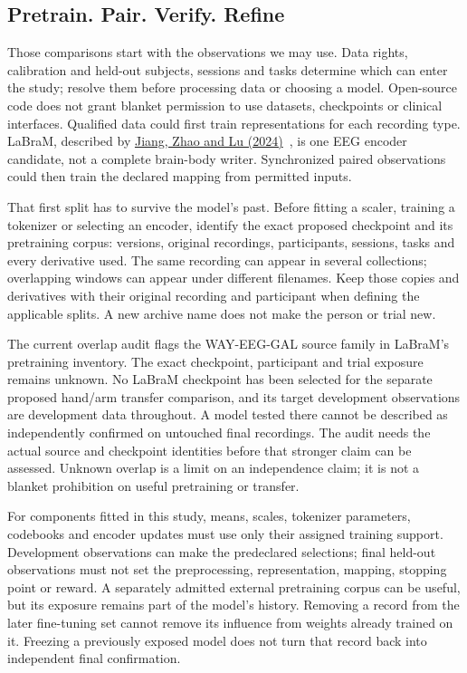 \subsection{Pretrain. Pair. Verify. Refine}
Those comparisons start with the observations we may use. Data rights,
calibration and held-out subjects, sessions and tasks determine which can
enter the study; resolve them before processing data or choosing a model.
Open-source code does not grant blanket permission to use datasets,
checkpoints or clinical interfaces. Qualified data could first train
representations for each recording type. LaBraM, described by \href{https://arxiv.org/html/2405.18765v1}{Jiang, Zhao and Lu (2024)}~\cite{labram2024}, is one EEG encoder
candidate, not a complete brain-body writer. Synchronized paired observations could
then train the declared mapping from permitted inputs.

That first split has to survive the model's past. Before fitting a scaler,
training a tokenizer or selecting an encoder, identify the exact proposed
checkpoint and its pretraining corpus: versions, original recordings,
participants, sessions, tasks and every derivative used. The same recording
can appear in several collections; overlapping windows can appear under
different filenames. Keep those copies and derivatives with their original
recording and participant when defining the applicable splits. A new archive
name does not make the person or trial new.

The current overlap audit flags the WAY-EEG-GAL source family in LaBraM's
pretraining inventory. The exact checkpoint, participant and trial exposure
remains unknown. No LaBraM checkpoint has been selected for the separate
proposed hand/arm transfer comparison, and its target development observations
are development data throughout. A model tested there cannot be described as
independently confirmed on untouched final recordings. The audit needs the
actual source and checkpoint identities before that stronger claim can be
assessed. Unknown overlap is a limit on an independence claim; it is not a
blanket prohibition on useful pretraining or transfer.

For components fitted in this study, means, scales, tokenizer parameters,
codebooks and encoder updates must use only their assigned training support.
Development observations can make the predeclared selections; final held-out
observations must not set the preprocessing, representation, mapping, stopping
point or reward. A separately admitted external pretraining corpus can be
useful, but its exposure remains part of the model's history. Removing a record
from the later fine-tuning set cannot remove its influence from weights already
trained on it. Freezing a previously exposed model does not turn that record
back into independent final confirmation.

